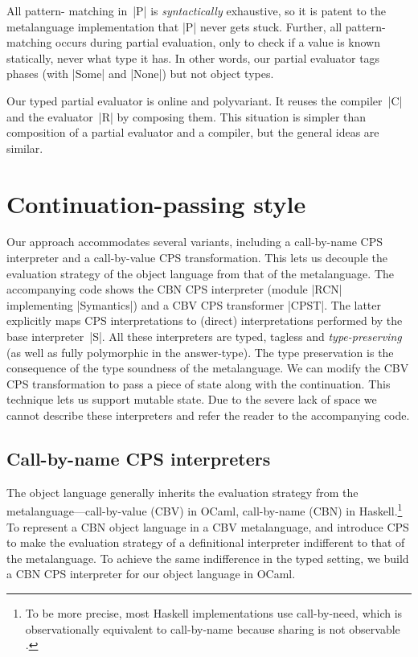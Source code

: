 \noindent All pattern\hyp
matching in~|P| is \emph{syntactically} exhaustive, so it is patent to the
metalanguage implementation that |P| never gets stuck.  Further, all
pattern\hyp matching occurs
during partial evaluation, only to check if a value is known statically,
never what type it has.  In other words, our partial evaluator tags
phases (with |Some| and |None|) but not object types.

Our typed partial evaluator is online and polyvariant.  It reuses the
compiler~|C| and the evaluator~|R| by composing them.  This situation is
simpler than  composition of a partial
evaluator and a compiler, but the general ideas are similar.
\fi


\ifshort\else
\section{Continuation\hyp passing style}\label{variations}

Our approach accommodates
several variants, including
a call-by-name CPS interpreter and a call-by-value CPS
transformation.
\ifshort\label{state}\label{S:CPS}%
This lets us decouple the evaluation strategy of the object language
from that of the metalanguage. The accompanying code shows the CBN CPS
interpreter (module |RCN| implementing |Symantics|) and a CBV CPS
transformer |CPST|. The latter explicitly maps CPS interpretations to
(direct) interpretations performed by the base interpreter~|S|. All
these interpreters are typed, tagless and \emph{type-preserving} (as
well as fully polymorphic in the answer-type). The type preservation
is the consequence of the type soundness of the metalanguage.  We can
modify the CBV CPS transformation to pass a piece of state along with
the continuation. This technique lets us support mutable state.  Due
to the severe lack of space we cannot describe these interpreters and
refer the reader to the accompanying code.

\else

\subsection{Call-by-name CPS interpreters}\label{S:CPS}

The object language generally inherits the evaluation strategy from
the metalanguage---call-by-value (CBV) in OCaml, call-by-name (CBN) in
Haskell.\footnote{To be more precise, most Haskell implementations
use call-by-need, which is observationally equivalent to call-by-name
because sharing is not observable \citep{ariola-call-by-need-popl}.}
To represent a CBN object language in a CBV metalanguage,
\citet{reynolds-definitional,reynolds-relation} and \citet{PlotkinCBN}
introduce CPS to make the evaluation strategy of a definitional
interpreter indifferent to that of the metalanguage. To achieve the same
indifference in the typed setting, we build a CBN CPS interpreter for
our object language in OCaml.


